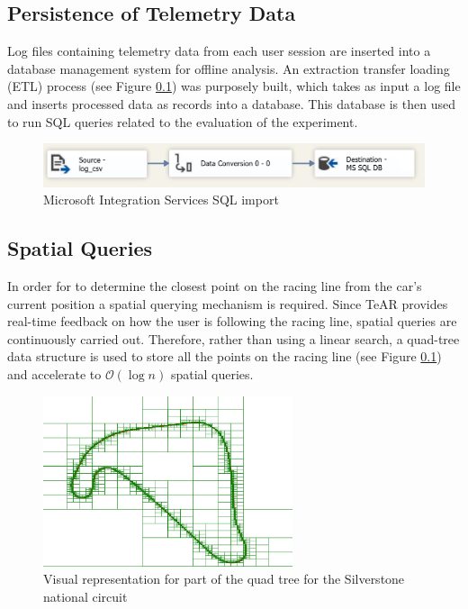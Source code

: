 \subsection{Persistence of Telemetry Data}
Log files containing telemetry data from each user session are inserted into a database management system for offline analysis. An extraction transfer loading (ETL) process (see Figure \ref{}) was purposely built, which takes as input a log file and inserts processed data as records into a database. This database is then used to run SQL queries related to the evaluation of the experiment.

\begin{figure}[!htb]
	\centering
	\includegraphics[width=\textwidth]{diagrams/ssis.png}
	\caption{Microsoft Integration Services SQL import}
	\label{fig:ssis}
\end{figure}

\subsection{Spatial Queries}
\label{sec:imp-SpatialQuerying}
In order for \methodname to determine the closest point on the racing line from the car's current position a spatial querying mechanism is required. Since TeAR provides real-time feedback on how the user is following the racing line, spatial queries are continuously carried out. Therefore, rather than using a linear search, a quad-tree data structure \cite{} is used to store all the points on the racing line (see Figure \ref{}) and accelerate to $\mathcal{O}(\log{n})$ spatial queries. 

\begin{figure}[!htb]
	\centering
	\includegraphics[height=5cm]{images/QuadTree}
	\caption{Visual representation for part of the quad tree for the Silverstone national circuit}
	\label{fig:QuadTree}
\end{figure}

